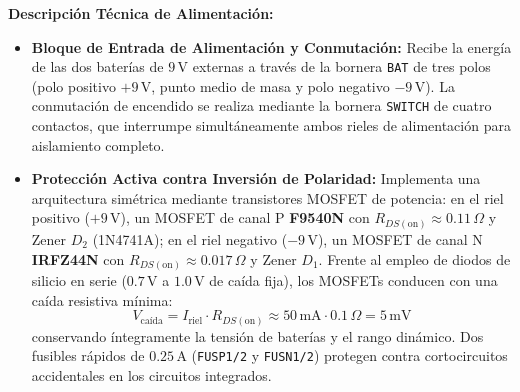 \documentclass[10pt,a4paper]{article}
\begin{document}
\vspace{0.3em}
\textbf{Descripción Técnica de Alimentación:}
\begin{itemize}
    \item \textbf{Bloque de Entrada de Alimentación y Conmutación:}
    Recibe la energía de las dos baterías de $9\,\text{V}$ externas a través de la bornera \texttt{BAT} de tres polos (polo positivo $+9\,\text{V}$, punto medio de masa y polo negativo $-9\,\text{V}$). La conmutación de encendido se realiza mediante la bornera \texttt{SWITCH} de cuatro contactos, que interrumpe simultáneamente ambos rieles de alimentación para aislamiento completo.
    
    \item \textbf{Protección Activa contra Inversión de Polaridad:}
    Implementa una arquitectura simétrica mediante transistores MOSFET de potencia: en el riel positivo ($+9\,\text{V}$), un MOSFET de canal P \textbf{F9540N} con $R_{DS(\text{on})} \approx 0.11\,\Omega$ y Zener $D_2$ (1N4741A); en el riel negativo ($-9\,\text{V}$), un MOSFET de canal N \textbf{IRFZ44N} con $R_{DS(\text{on})} \approx 0.017\,\Omega$ y Zener $D_1$. Frente al empleo de diodos de silicio en serie ($0.7\,\text{V}$ a $1.0\,\text{V}$ de caída fija), los MOSFETs conducen con una caída resistiva mínima:
    $$V_{\text{caída}} = I_{\text{riel}} \cdot R_{DS(\text{on})} \approx 50\,\text{mA} \cdot 0.1\,\Omega = 5\,\text{mV}$$
    conservando íntegramente la tensión de baterías y el rango dinámico. Dos fusibles rápidos de $0.25\,\text{A}$ (\texttt{FUSP1/2} y \texttt{FUSN1/2}) protegen contra cortocircuitos accidentales en los circuitos integrados.
\end{itemize}

\clearpage
\end{document}
